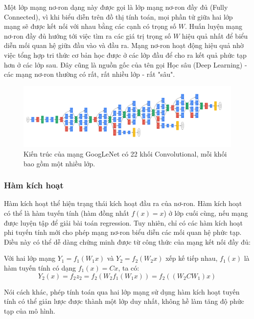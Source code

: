 \documentclass[12pt]{extreport}
\begin{document}
Một lớp mạng nơ-ron dạng này được gọi là lớp mạng nơ-ron đầy đủ (Fully Connected), vì khi biểu diễn trên đồ thị tính toán, mọi phần tử giữa hai lớp mạng sẽ được kết nối với nhau bằng các cạnh có trọng số $ W $. Huấn luyện mạng nơ-ron đầy đủ hướng tới việc tìm ra các giá trị trọng số $ W $ hiệu quả nhất để biểu diễn mối quan hệ giữa đầu vào và đầu ra. Mạng nơ-ron hoạt động hiệu quả nhờ việc tổng hợp tri thức cơ bản học được ở các lớp đầu để cho ra kết quả phức tạp hơn ở các lớp sau. Đây cũng là nguồn gốc của tên gọi Học sâu (Deep Learning) - các mạng nơ-ron thường có rất, rất nhiều lớp - rất "sâu".

\begin{figure}[H]
    \centering
    \includegraphics[width=\textwidth]{figure5}
    \caption{Kiến trúc của mạng GoogLeNet có 22 khối Convolutional, mỗi khối bao gồm một nhiều lớp.}
\end{figure}

\subsubsection{Hàm kích hoạt}

Hàm kích hoạt thể hiện trạng thái kích hoạt đầu ra của nơ-ron. Hàm kích hoạt có thể là hàm tuyến tính (hàm đồng nhất $ f(x) = x $) ở lớp cuối cùng, nếu mạng được luyện tập để giải bài toán regression. Tuy nhiên, chỉ có các hàm kích hoạt phi tuyến tính mới cho phép mạng nơ-ron biểu diễn các mối quan hệ phức tạp. Điều này có thể dễ dàng chứng minh được từ công thức của mạng kết nối đầy đủ:

Với hai lớp mạng $ Y_1 = f_1(W_1x) $ và $ Y_2 = f_2(W_2x) $ xếp kế tiếp nhau, $ f_1(x) $ là hàm tuyến tính có dạng $ f_1(x) = Cx $, ta có:
$$ Y_2(x) =  f_2z_2 = f_2(W_2f_1(W_1x)) = f_2((W_2CW_1)x) $$

Nói cách khác, phép tính toán qua hai lớp mạng sử dụng hàm kích hoạt tuyến tính có thể giản lược được thành một lớp duy nhất, không hề làm tăng độ phức tạp của mô hình.
\end{document}
